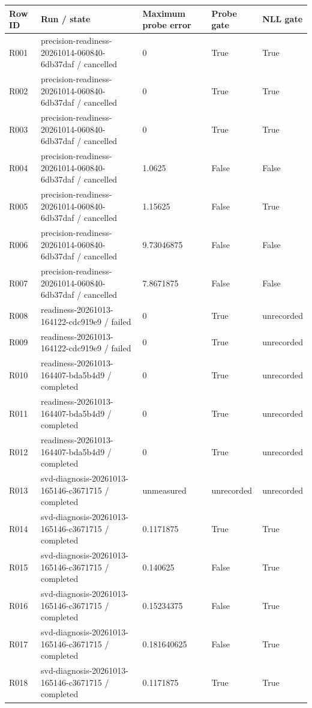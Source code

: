 \documentclass[10pt]{article}
\begin{document}
{\scriptsize\setlength{\tabcolsep}{2pt}
\begin{longtable}{p{}p{}p{}p{}p{}}
Row ID & Run / state & Maximum probe error & Probe gate & NLL gate \\
\hline\endhead
R001 & precision-readiness-20261014-060840-6db37daf / cancelled & 0 & True & True \\
R002 & precision-readiness-20261014-060840-6db37daf / cancelled & 0 & True & True \\
R003 & precision-readiness-20261014-060840-6db37daf / cancelled & 0 & True & True \\
R004 & precision-readiness-20261014-060840-6db37daf / cancelled & 1.0625 & False & False \\
R005 & precision-readiness-20261014-060840-6db37daf / cancelled & 1.15625 & False & True \\
R006 & precision-readiness-20261014-060840-6db37daf / cancelled & 9.73046875 & False & False \\
R007 & precision-readiness-20261014-060840-6db37daf / cancelled & 7.8671875 & False & False \\
R008 & readiness-20261013-164122-cdc919e9 / failed & 0 & True & unrecorded \\
R009 & readiness-20261013-164122-cdc919e9 / failed & 0 & True & unrecorded \\
R010 & readiness-20261013-164407-bda5b4d9 / completed & 0 & True & unrecorded \\
R011 & readiness-20261013-164407-bda5b4d9 / completed & 0 & True & unrecorded \\
R012 & readiness-20261013-164407-bda5b4d9 / completed & 0 & True & unrecorded \\
R013 & svd-diagnosis-20261013-165146-c3671715 / completed & unmeasured & unrecorded & unrecorded \\
R014 & svd-diagnosis-20261013-165146-c3671715 / completed & 0.1171875 & True & True \\
R015 & svd-diagnosis-20261013-165146-c3671715 / completed & 0.140625 & False & True \\
R016 & svd-diagnosis-20261013-165146-c3671715 / completed & 0.15234375 & False & True \\
R017 & svd-diagnosis-20261013-165146-c3671715 / completed & 0.181640625 & False & True \\
R018 & svd-diagnosis-20261013-165146-c3671715 / completed & 0.1171875 & True & True \\
\end{longtable}}
\end{document}
